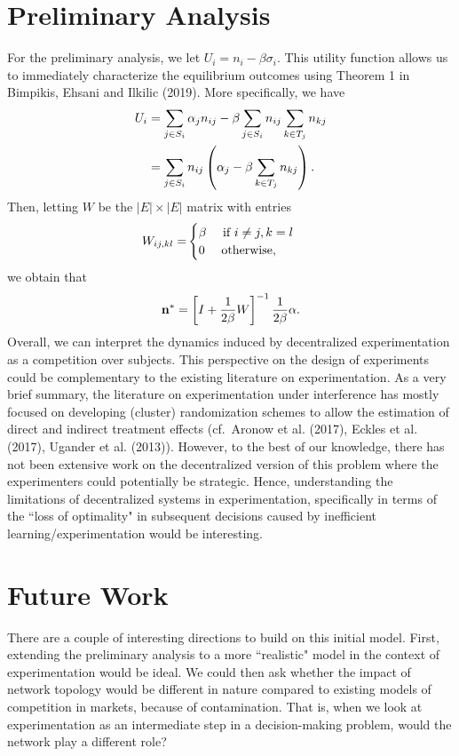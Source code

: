 \documentclass[12pt]{article}
\begin{document}
\section{Preliminary Analysis}
For the preliminary analysis, we let $U_i = n_i - \beta \sigma_i$. This utility function allows us to immediately characterize the equilibrium outcomes using Theorem 1 in Bimpikis, Ehsani and Ilkilic (2019). More specifically, we have
\begin{align}
U_i & =  \sum_{j \in S_i} \alpha_j n_{ij} - \beta \sum_{j \in S_i} n_{ij} \sum_{k \in T_j} n_{kj} \nonumber\\
& =  \sum_{j \in S_i} n_{ij} \left( \alpha_j - \beta \sum_{k \in T_j} n_{kj} \right).
\end{align}
Then, letting $W$ be the $|E| \times |E|$ matrix with entries
\begin{align}
W_{ij,kl} = & \begin{cases}
\beta \quad \mbox{ if } i \neq j, k = l \nonumber\\
0 \quad \mbox{ otherwise,}
\end{cases}
\end{align}
we obtain that
\begin{align}
\mathbf{n}^* = \left[ I + \frac{1}{2\beta} W \right]^{-1} \frac{1}{2\beta} {\alpha}.
\end{align}
Overall, we can interpret the dynamics induced by decentralized experimentation as a competition over subjects. This perspective on the design of experiments could be complementary to the existing literature on experimentation. As a very brief summary, the literature on experimentation under interference has mostly focused on developing (cluster) randomization schemes to allow the estimation of direct and indirect treatment effects (cf.~Aronow et al. (2017), Eckles et al. (2017), Ugander et al. (2013)). However, to the best of our knowledge, there has not been extensive work on the decentralized version of this problem where the experimenters could potentially be strategic. Hence, understanding the limitations of decentralized systems in experimentation, specifically in terms of the ``loss of optimality" in subsequent decisions caused by inefficient learning/experimentation would be interesting. %

\section{Future Work}
There are a couple of interesting directions to build on this initial model. First, extending the preliminary analysis to a more ``realistic" model in the context of experimentation would be ideal. We could then ask whether the impact of network topology would be different in nature compared to existing models of competition in markets, because of contamination. That is, when we look at experimentation as an intermediate step in a decision-making problem, would the network play a different role?
\end{document}
